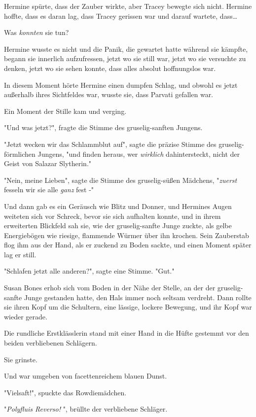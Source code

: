 {Hermine spürte, dass der Zauber wirkte, aber Tracey bewegte sich nicht. Hermine hoffte, dass es daran lag, dass Tracey gerissen war und darauf wartete, dass…

Was \emph{konnten} sie tun?

Hermine wusste es nicht und die Panik, die gewartet hatte während sie kämpfte, begann sie innerlich aufzufressen, jetzt wo sie still war, jetzt wo sie versuchte zu denken, jetzt wo sie sehen konnte, dass alles absolut hoffnungslos war.

In diesem Moment hörte Hermine einen dumpfen Schlag, und obwohl es jetzt außerhalb ihres Sichtfeldes war, wusste sie, dass Parvati gefallen war.

Ein Moment der Stille kam und verging.

"Und was jetzt?", fragte die Stimme des gruselig-sanften Jungens.

"Jetzt wecken wir das Schlammblut auf", sagte die präzise Stimme des gruselig-förmlichen Jungens, "und finden heraus, wer \emph{wirklich} dahintersteckt, nicht der Geist von Salazar Slytherin."

"Nein, meine Lieben", sagte die Stimme des gruselig-süßen Mädchens, "\emph{zuerst} fesseln wir sie alle \emph{ganz} fest -"

Und dann gab es ein Geräusch wie Blitz und Donner, und Hermines Augen weiteten sich vor Schreck, bevor sie sich aufhalten konnte, und in ihrem erweiterten Blickfeld sah sie, wie der gruselig-sanfte Junge zuckte, als gelbe Energiebögen wie riesige, flammende Würmer über ihn krochen. Sein Zauberstab flog ihm aus der Hand, als er zuckend zu Boden sackte, und einen Moment später lag er still.

"Schlafen jetzt alle anderen?", sagte eine Stimme. "Gut."

Susan Bones erhob sich vom Boden in der Nähe der Stelle, an der der gruselig-sanfte Junge gestanden hatte, den Hals immer noch seltsam verdreht. Dann rollte sie ihren Kopf um die Schultern, eine lässige, lockere Bewegung, und ihr Kopf war wieder gerade.

Die rundliche Erstklässlerin stand mit einer Hand in die Hüfte gestemmt vor den beiden verbliebenen Schlägern.

Sie grinste.

Und war umgeben von facettenreichem blauen Dunst.

"Vielsaft!", spuckte das Rowdiemädchen.

"\emph{Polyfluis Reverso!} ", brüllte der verbliebene Schläger.

}
